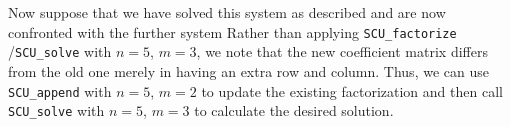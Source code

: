 \documentclass{galahad}
\newcommand{\packagename}{SCU}
\begin{document}
Now suppose that we have solved this system as described and are now
confronted with the further system
Rather than applying {\tt \packagename\_factorize} /{\tt \packagename\_solve}
with $n = 5$, $m = 3$, we note
that the new coefficient matrix differs from the old one merely
in having
an extra row and column. Thus, we can use
{\tt \packagename\_append} with $n = 5$, $m = 2$ to update the existing factorization
and then call
{\tt \packagename\_solve} with $n = 5$, $m = 3$ to calculate the desired solution.
\end{document}
